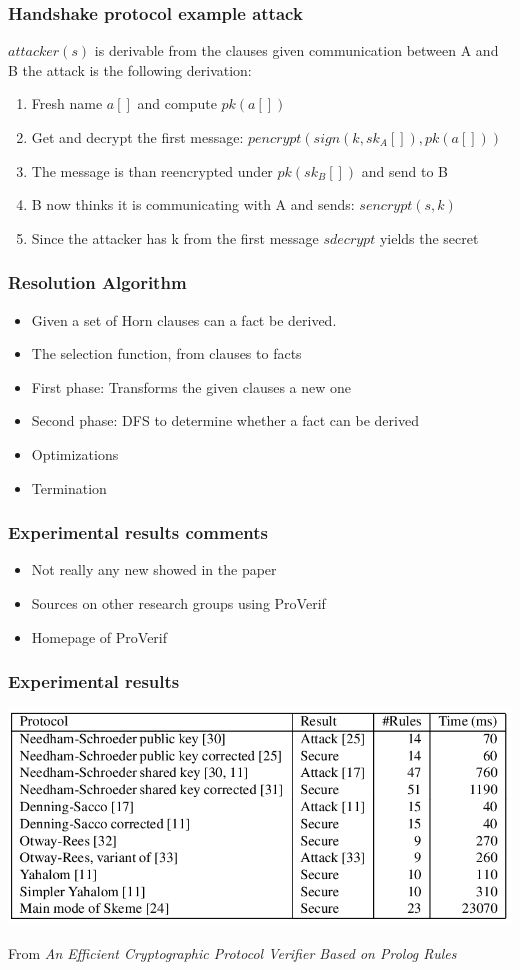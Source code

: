 \documentclass[10pt]{beamer}
\begin{document}
\begin{frame}
  \frametitle{Handshake protocol example attack}
  $attacker(s)$ is derivable from the clauses given communication between A and B the attack is the following derivation:
  \begin{enumerate}
  \item Fresh name $a[]$ and compute $pk(a[])$
  \item Get and decrypt the first message: $pencrypt(sign(k,sk_A[]),pk(a[]))$ 
  \item The message is than reencrypted under $pk(sk_B[])$ and send to B
  \item B now thinks it is communicating with A and sends: $sencrypt(s,k)$
  \item Since the attacker has k from the first message $sdecrypt$ yields the secret
  \end{enumerate}
\end{frame}


\begin{frame}
  \frametitle{Resolution Algorithm}
  \begin{itemize}
  \item Given a set of Horn clauses can a fact be derived.

  \item The selection function, from clauses to facts
  \item First phase: Transforms the given clauses a new one
  \item Second phase: DFS to determine whether a fact can be derived
  \item Optimizations
  \item Termination
  \end{itemize}
\end{frame}

\begin{frame}
  \frametitle{Experimental results comments}
  \begin{itemize}
  \item Not really any new showed in the paper
  \item Sources on other research groups using ProVerif
  \item Homepage of ProVerif
  \end{itemize}
\end{frame}

\begin{frame}
  \frametitle{Experimental results}
  \begin{center}
    \includegraphics[width=.8\textwidth]{graphics/results.png}
  \end{center}
  From \textit{An Efficient Cryptographic Protocol Verifier Based on Prolog Rules}
\end{frame}
\end{document}
